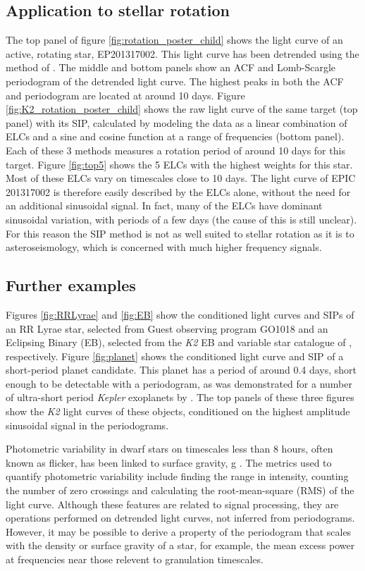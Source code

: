 \documentclass[useAMS, usenatbib]{aastex}
\begin{document}
\subsection{Application to stellar rotation}
The top panel of figure \ref{fig:rotation_poster_child} shows the light curve
of an active, rotating star, EP201317002.
This light curve has been detrended using the method of
\citet{Vanderburg2014}.
The middle and bottom panels show an ACF and Lomb-Scargle periodogram of the
detrended light curve.
The highest peaks in both the ACF and periodogram are located at around 10
days.
Figure \ref{fig:K2_rotation_poster_child} shows the raw light curve of the
same target (top panel) with its SIP, calculated by modeling the data as
a linear combination of ELCs and a sine and cosine function at a range of
frequencies (bottom panel).
Each of these 3 methods measures a rotation period of around 10 days for this
target.
Figure \ref{fig:top5} shows the 5 ELCs with the highest weights for this star.
Most of these ELCs vary on timescales close to 10 days.
The light curve of EPIC 201317002 is therefore easily described by the ELCs
alone, without the need for an additional sinusoidal signal.
In fact, many of the ELCs have dominant sinusoidal variation, with periods
of a few days (the cause of this is still unclear).
For this reason the SIP method is not as well suited to stellar rotation as it
is to asteroseismology, which is concerned with much higher frequency signals.

\subsection{Further examples}
Figures \ref{fig:RRLyrae} and \ref{fig:EB} show the conditioned light curves
and SIPs of an RR Lyrae star, selected from Guest observing program GO1018 and
an Eclipsing Binary (EB), selected from the {\it K2} EB and variable star
catalogue of \citet{Armstrong2015}, respectively.
Figure \ref{fig:planet} shows the conditioned light curve and SIP of a
short-period planet candidate.
This planet has a period of around 0.4 days, short enough to be detectable
with a periodogram, as was demonstrated for a number of ultra-short
period {\it Kepler} exoplanets by \citet{Sanchis-Ojeda2014}.
The top panels of these three figures show the {\it K2} light curves of these
objects, conditioned on the highest amplitude sinusoidal signal in the
periodograms.

Photometric variability in dwarf stars on timescales less than 8 hours, often
known as flicker, has been linked to surface gravity, g
\citep[][]{Bastien2013, Kipping2014}.
The metrics used to quantify photometric variability include finding the range
in intensity, counting the number of zero crossings and calculating the
root-mean-square (RMS) of the light curve.
Although these features are related to signal processing, they are operations
performed on detrended light curves, not inferred from periodograms.
However, it may be possible to derive a property of the periodogram that scales
with the density or surface gravity of a star, for example, the mean excess
power at frequencies near those relevent to granulation timescales.
\end{document}
